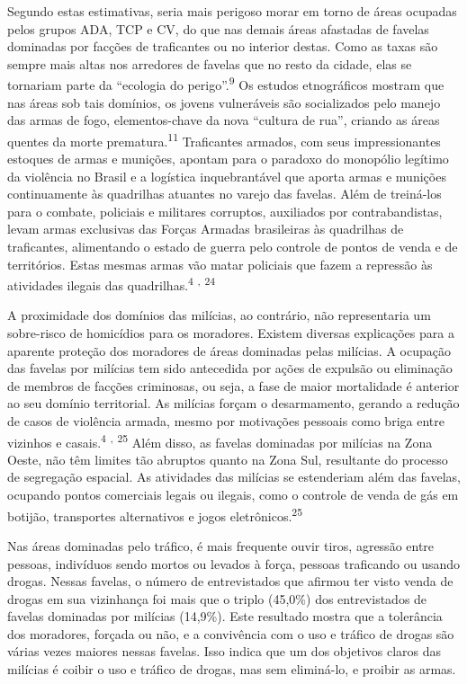 \documentclass{article}
\begin{document}
Segundo estas estimativas, seria mais perigoso morar em torno de áreas ocupadas
pelos grupos ADA, TCP e CV, do que nas demais áreas afastadas de favelas
dominadas por facções de traficantes ou no interior destas. Como as taxas são
sempre mais altas nos arredores de favelas que no resto da cidade, elas se
tornariam parte da “ecologia do perigo”.\textsuperscript{9}
Os estudos etnográficos mostram que nas áreas sob tais domínios, os jovens
vulneráveis são socializados pelo manejo das armas de fogo, elementos-chave da
nova “cultura de rua”, criando as áreas quentes da morte
prematura.\textsuperscript{11}
Traficantes armados, com seus impressionantes estoques de armas e munições,
apontam para o paradoxo do monopólio legítimo da violência no Brasil e a
logística inquebrantável que aporta armas e munições continuamente às quadrilhas
atuantes no varejo das favelas. Além de treiná-los para o combate, policiais e
militares corruptos, auxiliados por contrabandistas, levam armas exclusivas das
Forças Armadas brasileiras às quadrilhas de traficantes, alimentando o estado de
guerra pelo controle de pontos de venda e de territórios. Estas mesmas armas vão
matar policiais que fazem a repressão às atividades ilegais das
quadrilhas.\textsuperscript{4}
\textsuperscript{,}
\textsuperscript{24}

A proximidade dos domínios das milícias, ao contrário, não representaria um
sobre-risco de homicídios para os moradores. Existem diversas explicações para a
aparente proteção dos moradores de áreas dominadas pelas milícias. A ocupação
das favelas por milícias tem sido antecedida por ações de expulsão ou eliminação
de membros de facções criminosas, ou seja, a fase de maior mortalidade é
anterior ao seu domínio territorial. As milícias forçam o desarmamento, gerando
a redução de casos de violência armada, mesmo por motivações pessoais como briga
entre vizinhos e casais.\textsuperscript{4}
\textsuperscript{,}
\textsuperscript{25}
Além disso, as favelas dominadas por milícias na Zona Oeste, não têm limites tão
abruptos quanto na Zona Sul, resultante do processo de segregação espacial. As
atividades das milícias se estenderiam além das favelas, ocupando pontos
comerciais legais ou ilegais, como o controle de venda de gás em botijão,
transportes alternativos e jogos eletrônicos.\textsuperscript{25}

Nas áreas dominadas pelo tráfico, é mais frequente ouvir tiros, agressão entre
pessoas, indivíduos sendo mortos ou levados à força, pessoas traficando ou
usando drogas. Nessas favelas, o número de entrevistados que afirmou ter visto
venda de drogas em sua vizinhança foi mais que o triplo (45,0\%) dos
entrevistados de favelas dominadas por milícias (14,9\%). Este resultado mostra
que a tolerância dos moradores, forçada ou não, e a convivência com o uso e
tráfico de drogas são várias vezes maiores nessas favelas. Isso indica que um
dos objetivos claros das milícias é coibir o uso e tráfico de drogas, mas sem
eliminá-lo, e proibir as armas.
\end{document}
